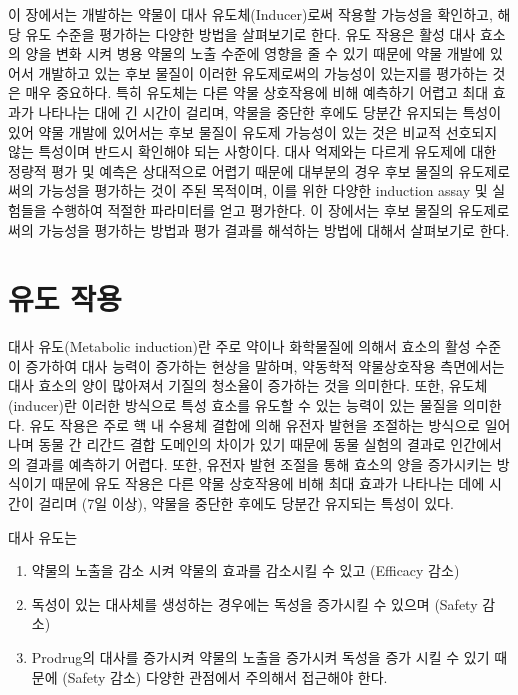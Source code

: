\documentclass[
  11pt,
  krantz2, a4paper, twoside]{krantz}
\providecommand{\tightlist}{%
  \setlength{\itemsep}{0pt}\setlength{\parskip}{0pt}}
\begin{document}
이 장에서는 개발하는 약물이 대사 유도체(Inducer)로써 작용할 가능성을
확인하고, 해당 유도 수준을 평가하는 다양한 방법을 살펴보기로 한다. 유도
작용은 활성 대사 효소의 양을 변화 시켜 병용 약물의 노출 수준에 영향을 줄
수 있기 때문에 약물 개발에 있어서 개발하고 있는 후보 물질이 이러한
유도제로써의 가능성이 있는지를 평가하는 것은 매우 중요하다. 특히
유도체는 다른 약물 상호작용에 비해 예측하기 어렵고 최대 효과가 나타나는
대에 긴 시간이 걸리며, 약물을 중단한 후에도 당분간 유지되는 특성이 있어
약물 개발에 있어서는 후보 물질이 유도제 가능성이 있는 것은 비교적
선호되지 않는 특성이며 반드시 확인해야 되는 사항이다. 대사 억제와는
다르게 유도제에 대한 정량적 평가 및 예측은 상대적으로 어렵기 때문에
대부분의 경우 후보 물질의 유도제로써의 가능성을 평가하는 것이 주된
목적이며, 이를 위한 다양한 induction assay 및 실험들을 수행하여 적절한
파라미터를 얻고 평가한다. 이 장에서는 후보 물질의 유도제로써의 가능성을
평가하는 방법과 평가 결과를 해석하는 방법에 대해서 살펴보기로 한다.

\hypertarget{uxc720uxb3c4-uxc791uxc6a9}{%
\section{유도 작용}\label{uxc720uxb3c4-uxc791uxc6a9}}

대사 유도(Metabolic induction)란 주로 약이나 화학물질에 의해서 효소의
활성 수준이 증가하여 대사 능력이 증가하는 현상을 말하며, 약동학적
약물상호작용 측면에서는 대사 효소의 양이 많아져서 기질의 청소율이
증가하는 것을 의미한다. 또한, 유도체(inducer)란 이러한 방식으로 특성
효소를 유도할 수 있는 능력이 있는 물질을 의미한다. 유도 작용은 주로 핵
내 수용체 결합에 의해 유전자 발현을 조절하는 방식으로 일어나며 동물 간
리간드 결합 도메인의 차이가 있기 때문에 동물 실험의 결과로 인간에서의
결과를 예측하기 어렵다. 또한, 유전자 발현 조절을 통해 효소의 양을
증가시키는 방식이기 때문에 유도 작용은 다른 약물 상호작용에 비해 최대
효과가 나타나는 데에 시간이 걸리며 (7일 이상), 약물을 중단한 후에도
당분간 유지되는 특성이 있다.

대사 유도는

\begin{enumerate}
\def\labelenumi{\arabic{enumi})}
\tightlist
\item
  약물의 노출을 감소 시켜 약물의 효과를 감소시킬 수 있고 (Efficacy
  감소)
\item
  독성이 있는 대사체를 생성하는 경우에는 독성을 증가시킬 수 있으며
  (Safety 감소)
\item
  Prodrug의 대사를 증가시켜 약물의 노출을 증가시켜 독성을 증가 시킬 수
  있기 때문에 (Safety 감소) 다양한 관점에서 주의해서 접근해야 한다.
\end{enumerate}
\end{document}

